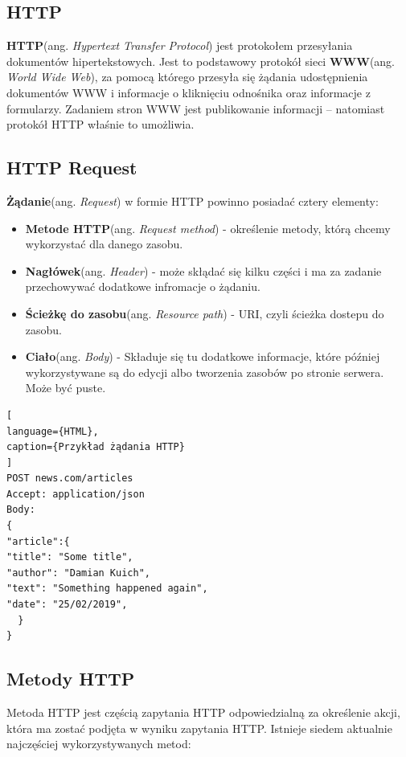 \documentclass[oneside,polski,logo,indent]{amuthesis}
\begin{document}
\begin{center}
\subsection{HTTP}
\end{center}

\textbf{HTTP}(ang. \emph{Hypertext Transfer Protocol}) jest protokołem przesyłania dokumentów hipertekstowych. Jest to podstawowy protokół sieci \textbf{WWW}(ang. \emph{World Wide Web}), za pomocą którego przesyła się żądania udostępnienia dokumentów WWW i informacje o kliknięciu odnośnika oraz informacje z formularzy. Zadaniem stron WWW jest publikowanie informacji – natomiast protokół HTTP właśnie to umożliwia.

\begin{center}
\subsection{HTTP Request}
\end{center}
\textbf{Żądanie}(ang. \emph{Request}) w formie HTTP powinno posiadać cztery elementy:
\begin{itemize}
\item \textbf{Metode HTTP}(ang. \emph{Request method}) - określenie metody, którą chcemy wykorzystać dla danego zasobu.
\item \textbf{Nagłówek}(ang. \emph{Header}) - może skłądać się kilku części i ma za zadanie przechowywać dodatkowe infromacje o żądaniu.
\item \textbf{Ścieżkę do zasobu}(ang. \emph{Resource path}) - URI, czyli ścieżka dostepu do zasobu.
\item \textbf{Ciało}(ang. \emph{Body}) - Składuje się tu dodatkowe informacje, które później wykorzystywane są do edycji albo tworzenia zasobów po stronie serwera. Może być puste.
\end{itemize}


\begin{lstlisting}[
language={HTML},
caption={Przykład żądania HTTP}
]
POST news.com/articles
Accept: application/json
Body:
{
"article":{
"title": "Some title",
"author": "Damian Kuich",
"text": "Something happened again",
"date": "25/02/2019",
  }
}
\end{lstlisting}

\begin{center}
\subsection{Metody HTTP}
\end{center}
Metoda HTTP jest częścią zapytania HTTP odpowiedzialną za określenie akcji, która ma zostać podjęta w wyniku zapytania HTTP. Istnieje siedem aktualnie najczęściej wykorzystywanych metod:
\end{document}
